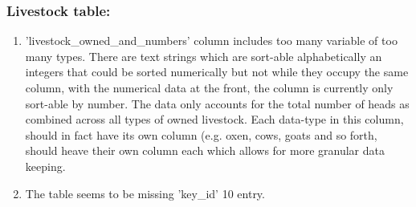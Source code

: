 \documentclass{article}
\begin{document}
\subsubsection{Livestock table:}
\begin{enumerate}
    \item 'livestock\_owned\_and\_numbers' column includes too many variable of too many types. There are text strings which are sort-able alphabetically an integers that could be sorted numerically but not while they occupy the same column, with the numerical data at the front, the column is currently only sort-able by number. The data only accounts for the total number of heads as combined across all types of owned livestock. Each data-type in this column, should in fact have its own column (e.g. oxen, cows, goats and so forth, should heave their own column each which allows for more granular data keeping.
    \item The table seems to be missing 'key\_id' 10 entry.
\end{enumerate}
\end{document}
